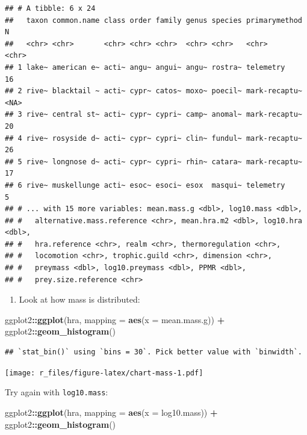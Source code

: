 \documentclass[]{Nemilov}
\newenvironment{Shaded}{\begin{snugshade}}{\end{snugshade}}
\newcommand{\DataTypeTok}[1]{\textcolor[rgb]{0.13,0.29,0.53}{#1}}
\newcommand{\KeywordTok}[1]{\textcolor[rgb]{0.13,0.29,0.53}{\textbf{#1}}}
\newcommand{\NormalTok}[1]{#1}
\newcommand{\OperatorTok}[1]{\textcolor[rgb]{0.81,0.36,0.00}{\textbf{#1}}}
\newcommand{\StringTok}[1]{\textcolor[rgb]{0.31,0.60,0.02}{#1}}
\providecommand{\tightlist}{%
  \setlength{\itemsep}{0pt}\setlength{\parskip}{0pt}}
\begin{document}
\begin{verbatim}
## # A tibble: 6 x 24
##   taxon common.name class order family genus species primarymethod N    
##   <chr> <chr>       <chr> <chr> <chr>  <chr> <chr>   <chr>         <chr>
## 1 lake~ american e~ acti~ angu~ angui~ angu~ rostra~ telemetry     16   
## 2 rive~ blacktail ~ acti~ cypr~ catos~ moxo~ poecil~ mark-recaptu~ <NA> 
## 3 rive~ central st~ acti~ cypr~ cypri~ camp~ anomal~ mark-recaptu~ 20   
## 4 rive~ rosyside d~ acti~ cypr~ cypri~ clin~ fundul~ mark-recaptu~ 26   
## 5 rive~ longnose d~ acti~ cypr~ cypri~ rhin~ catara~ mark-recaptu~ 17   
## 6 rive~ muskellunge acti~ esoc~ esoci~ esox  masqui~ telemetry     5    
## # ... with 15 more variables: mean.mass.g <dbl>, log10.mass <dbl>,
## #   alternative.mass.reference <chr>, mean.hra.m2 <dbl>, log10.hra <dbl>,
## #   hra.reference <chr>, realm <chr>, thermoregulation <chr>,
## #   locomotion <chr>, trophic.guild <chr>, dimension <chr>,
## #   preymass <dbl>, log10.preymass <dbl>, PPMR <dbl>,
## #   prey.size.reference <chr>
\end{verbatim}

\begin{enumerate}
\def\labelenumi{\arabic{enumi}.}
\tightlist
\item
  Look at how mass is distributed:
\end{enumerate}

\begin{Shaded}
\begin{Highlighting}[]
\NormalTok{ggplot2}\OperatorTok{::}\KeywordTok{ggplot}\NormalTok{(hra, }\DataTypeTok{mapping =} \KeywordTok{aes}\NormalTok{(}\DataTypeTok{x =}\NormalTok{ mean.mass.g)) }\OperatorTok{+}
\StringTok{  }\NormalTok{ggplot2}\OperatorTok{::}\KeywordTok{geom_histogram}\NormalTok{()}
\end{Highlighting}
\end{Shaded}

\begin{verbatim}
## `stat_bin()` using `bins = 30`. Pick better value with `binwidth`.
\end{verbatim}

\texttt{[image: r\_files/figure-latex/chart-mass-1.pdf]}

Try again with \texttt{log10.mass}:

\begin{Shaded}
\begin{Highlighting}[]
\NormalTok{ggplot2}\OperatorTok{::}\KeywordTok{ggplot}\NormalTok{(hra, }\DataTypeTok{mapping =} \KeywordTok{aes}\NormalTok{(}\DataTypeTok{x =}\NormalTok{ log10.mass)) }\OperatorTok{+}
\StringTok{  }\NormalTok{ggplot2}\OperatorTok{::}\KeywordTok{geom_histogram}\NormalTok{()}
\end{Highlighting}
\end{Shaded}
\end{document}
